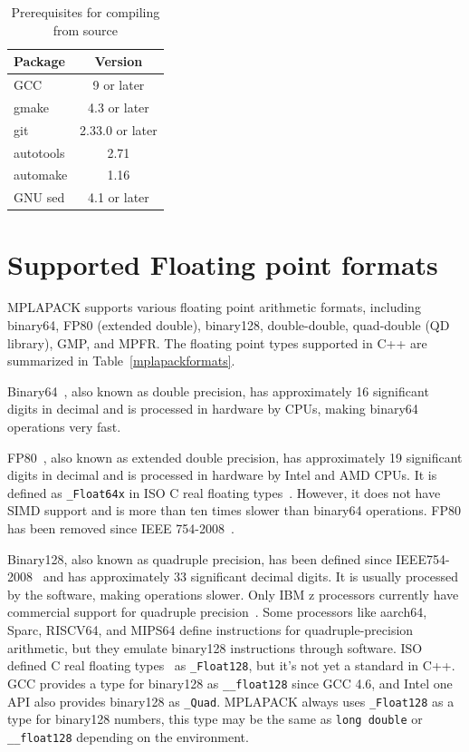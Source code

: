 \documentclass[12pt]{article}
\begin{document}
\begin{table}
\caption{Prerequisites for compiling from source}
\begin{center}\label{prerequisites}
\begin{tabular}{lc}
Package & Version \\ \hline
GCC & 9 or later \\
gmake & 4.3 or later \\
git & 2.33.0 or later\\
autotools & 2.71 \\
automake & 1.16 \\
GNU sed & 4.1 or later \\
\hline
\end{tabular}
\end{center}
\end{table}

\section{Supported Floating point formats}
\label{sec:floatingpointformat}

MPLAPACK supports various floating point arithmetic formats, including binary64, FP80 (extended double), binary128, double-double, quad-double (QD library), GMP, and MPFR. The floating point types supported in C++ are summarized in Table~\ref{mplapackformats}.

Binary64~\cite{4610935}, also known as double precision, has approximately 16 significant digits in decimal and is processed in hardware by CPUs, making binary64 operations very fast.

FP80~\cite{30711}, also known as extended double precision, has approximately 19 significant digits in decimal and is processed in hardware by Intel and AMD CPUs. It is defined as {\tt \_Float64x} in ISO C real floating types~\cite{18661-3}. However, it does not have SIMD support and is more than ten times slower than binary64 operations. FP80 has been removed since IEEE 754-2008~\cite{4610935}.

Binary128, also known as quadruple precision, has been defined since IEEE754-2008~\cite{4610935} and has approximately 33 significant decimal digits. It is usually processed by the software, making operations slower. Only IBM z processors currently have commercial support for quadruple precision~\cite{IBMz13}.  Some processors like aarch64, Sparc, RISCV64, and MIPS64 define instructions for quadruple-precision arithmetic, but they emulate binary128 instructions through software. ISO defined C real floating types~\cite{18661-3} as {\tt \_Float128}, but it's not yet a standard in C++. GCC provides a type for binary128 as {\tt \_\_float128} since GCC 4.6, and Intel one API also provides binary128 as {\tt \_Quad}. MPLAPACK always uses {\tt \_Float128} as a type for binary128 numbers, this type may be the same as {\tt long double} or {\tt \_\_float128} depending on the environment.
\end{document}
